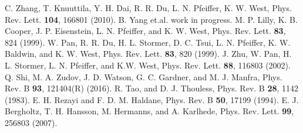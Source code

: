 \documentclass[twocolumn,showpacs,amsmath,amstex,amssymb,mathfonts,prb]{revtex4-1}
\begin{document}
\begin{thebibliography}{99}
 C. Zhang, T. Knuuttila, Y. H. Dai, R. R. Du, L. N. Pfeiffer, K. W. West, Phys. Rev. Lett. {\bf 104}, 166801 (2010).
 B. Yang et.al. work in progress.
M. P. Lilly, K. B. Cooper, J. P. Eisenstein, L. N. Pfeiffer, and K. W. West, Phys. Rev. Lett. {\bf 83}, 824 (1999).
 W. Pan, R. R. Du, H. L. Stormer, D. C. Tsui, L. N. Pfeiffer, K. W. Baldwin, and K. W. West, Phys. Rev. Lett. {\bf 83}, 820 (1999).
 J. Zhu, W. Pan, H. L. Stormer, L. N. Pfeiffer, and K.W. West, Phys. Rev. Lett. {\bf 88}, 116803 (2002).
 Q. Shi, M. A. Zudov, J. D. Watson, G. C. Gardner, and M. J. Manfra, Phys. Rev. B {\bf 93}, 121404(R) (2016).
 R. Tao, and D. J. Thouless, Phys. Rev. B {\bf 28}, 1142 (1983).
 E. H. Rezayi and F. D. M. Haldane, Phys. Rev. B {\bf 50}, 17199 (1994).
 E. J. Bergholtz, T. H. Hansson, M. Hermanns, and A. Karlhede, Phys. Rev. Lett. {\bf 99}, 256803 (2007).
\end{thebibliography}
\end{document}
